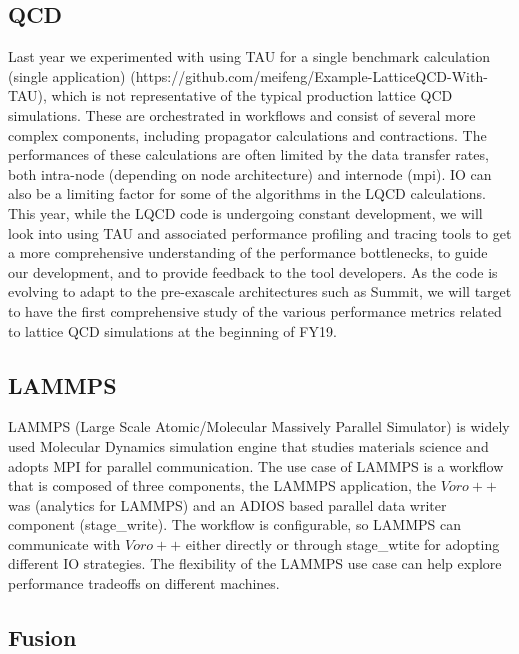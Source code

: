 \subsection{QCD}
Last year we experimented with using TAU for a single benchmark calculation (single application) (https://github.com/meifeng/Example-LatticeQCD-With-TAU), which is not representative of the typical production lattice QCD simulations.  These are orchestrated in workflows and consist of several more complex components, including propagator calculations and contractions. The performances of these calculations are often limited by the data transfer rates, both intra-node (depending on node architecture) and internode (mpi). IO can also be a limiting factor for some of the algorithms in the LQCD calculations. This year, while the LQCD code is undergoing constant development, we will look into using TAU and associated performance profiling and tracing tools to get a more comprehensive understanding of the performance bottlenecks, to guide our development, and to provide feedback to the tool developers. As the code is evolving to adapt to the pre-exascale architectures such as Summit, we will target to have the first comprehensive study of the various performance metrics related to lattice QCD simulations at the beginning of FY19. 

\subsection {LAMMPS}

LAMMPS (Large Scale Atomic/Molecular Massively Parallel Simulator)  is widely used Molecular Dynamics simulation engine that studies materials science and adopts MPI for parallel communication. The use case of LAMMPS is a workflow that is composed of three components, the LAMMPS application, the $Voro++$ was (analytics for LAMMPS) and an ADIOS based parallel data writer component (stage\_write). The workflow is configurable, so LAMMPS can communicate with $Voro++$ either directly or through stage\_wtite for adopting different IO strategies. The flexibility of the LAMMPS use case can help explore performance tradeoffs on different machines.

\subsection{Fusion}
